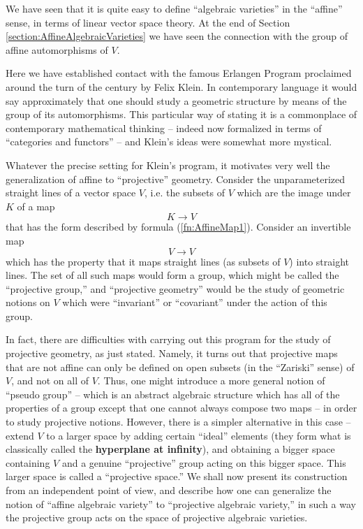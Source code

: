 \documentclass[12pt]{book}
\theoremstyle{plain}
\theoremstyle{definition}
\begin{document}
We have seen that it is quite easy to define ``algebraic varieties'' in the ``affine'' sense, in terms of linear vector space theory.
At the end of Section \ref{section:AffineAlgebraicVarieties} we have seen the connection with the group of affine automorphisms of $V$.

Here we have established contact with the famous Erlangen Program proclaimed around the turn of the century by Felix Klein.
In contemporary language it would say approximately that one should study a geometric structure by means of the group of its automorphisms.
This particular way of stating it is a commonplace of contemporary mathematical thinking -- indeed now formalized in terms of ``categories and functors'' -- and Klein's ideas were somewhat more mystical.

Whatever the precise setting for Klein's program, it motivates very well the generalization of affine to ``projective'' geometry.
Consider the unparameterized straight lines of a vector space $V$, i.e. the subsets of $V$ which are the image under $K$ of a map
$$K \to V$$
that has the form described by formula (\ref{fn:AffineMap1}).
Consider an invertible map
$$V \to V$$
which has the property that it maps straight lines (as subsets of $V$) into straight lines.
The set of all such maps would form a group, which might be called the ``projective group,'' and ``projective geometry'' would be the study of geometric notions on $V$ which were ``invariant'' or ``covariant'' under the action of this group.

In fact, there are difficulties with carrying out this program for the study of projective geometry, as just stated.
Namely, it turns out that projective maps that are not affine can only be defined on open subsets (in the ``Zariski'' sense) of $V$, and not on all of $V$.
Thus, one might introduce a more general notion of ``pseudo group'' -- which is an abstract algebraic structure which has all of the properties of a group except that one cannot always compose two maps -- in order to study projective notions.
However, there is a simpler alternative in this case -- extend $V$ to a larger space by adding certain ``ideal'' elements (they form what is classically called the \textbf{hyperplane at infinity}), and obtaining a bigger space containing $V$ and a genuine ``projective'' group acting on this bigger space.
This larger space is called a ``projective space.''
We shall now present its construction from an independent point of view, and describe how one can generalize the notion of ``affine algebraic variety'' to ``projective algebraic variety,'' in such a way the projective group acts on the space of projective algebraic varieties.
\end{document}
